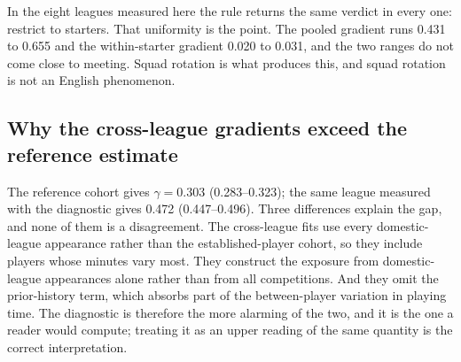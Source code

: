 \documentclass[11pt]{article}
\begin{document}
In the eight leagues measured here the rule returns the same verdict in every one: restrict to starters. That uniformity is the point. The pooled gradient runs 0.431 to 0.655 and the within-starter gradient 0.020 to 0.031, and the two ranges do not come close to meeting. Squad rotation is what produces this, and squad rotation is not an English phenomenon.

\subsection*{Why the cross-league gradients exceed the reference estimate}

The reference cohort gives $\gamma = 0.303$ (0.283--0.323); the same league measured with the diagnostic gives 0.472 (0.447--0.496). Three differences explain the gap, and none of them is a disagreement. The cross-league fits use every domestic-league appearance rather than the established-player cohort, so they include players whose minutes vary most. They construct the exposure from domestic-league appearances alone rather than from all competitions. And they omit the prior-history term, which absorbs part of the between-player variation in playing time. The diagnostic is therefore the more alarming of the two, and it is the one a reader would compute; treating it as an upper reading of the same quantity is the correct interpretation.
\end{document}
